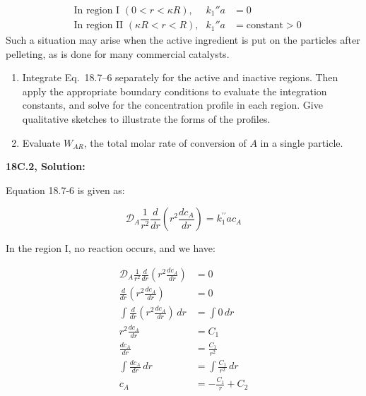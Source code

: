 \documentclass[letterpaper,12pt]{article}
\begin{document}
\begin{align}
    &\text{In region I $\left( 0 < r < \kappa R \right)$,} & k_1'' a &= 0 \tag{18C.2--1} \\
    &\text{In region II $\left( \kappa R < r < R \right)$,} & k_1'' a &= \text{constant} > 0 \tag{18C.2--2}
\end{align}
Such a situation may arise when the active ingredient is put on the particles after pelleting, as is done for many commercial catalysts.

\begin{enumerate}
    \item[(a)] Integrate Eq.~18.7--6 separately for the active and inactive regions. Then apply the appropriate boundary conditions to evaluate the integration constants, and solve for the concentration profile in each region. Give qualitative sketches to illustrate the forms of the profiles.

    \item[(b)] Evaluate $W_{AR}$, the total molar rate of conversion of $A$ in a single particle.
\end{enumerate}

\vspace{6pt}

\textbf{18C.2, Solution:}

Equation 18.7-6 is given as:

\begin{equation}
    \mathcal{D}_A \frac{1}{r^2} \frac{d}{dr} \left(r^2 \frac{dc_A}{dr} \right) = k_1^{\prime\prime}a c_A
\end{equation}

In the region I, no reaction occurs, and we have:

\begin{equation}
\begin{aligned}
    \mathcal{D}_A \frac{1}{r^2} \frac{d}{dr} \left(r^2 \frac{dc_A}{dr} \right) &= 0 \\
    \frac{d}{dr} \left(r^2 \frac{dc_A}{dr} \right)                             &= 0 \\
    \int \frac{d}{dr} \left(r^2 \frac{dc_A}{dr} \right) \, dr                  &= \int 0 \, dr \\
    r^2 \frac{dc_A}{dr}                                                        &= C_1 \\
    \frac{dc_A}{dr}                                                            &= \frac{C_1}{r^2} \\
    \int \frac{dc_A}{dr} \, dr                                                 &= \int \frac{C_1}{r^2} \, dr\\ 
    c_A                                                                        &= - \frac{C_1}{r} + C_2
\end{aligned}
\end{equation}
\end{document}
